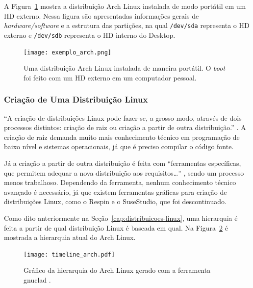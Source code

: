 \documentclass[
article,			%
12pt,				%
openright,			%
oneside,			%
a4paper,			%
chapter=TITLE,		%
section=TITLE,		%
subsection=TITLE,	%
subsubsection=TITLE,%
subsubsubsection=TITLE, %
english,			%
brazil,				%
]{abntex2}
\def\code#1{\texttt{#1}}
\begin{document}
A Figura~\ref{fig:exemplo-distro} mostra a distribuição Arch Linux
instalada de modo portátil em um HD externo. Nessa figura são
apresentadas informações gerais de \emph{hardware/software} e a
estrutura das partições, na qual \code{/dev/sda} representa o HD
externo e \code{/dev/sdb} representa o HD interno do Desktop.

\begin{figure}[!htbp]
    \caption{\label{fig:exemplo-distro}Uma distribuição Arch Linux
        instalada de maneira portátil. O \emph{boot} foi feito com um HD
    externo em um computador pessoal.}
    \begin{center}
        \texttt{[image: exemplo\_arch.png]}
    \end{center}
\end{figure}

\subsubsection{Criação de Uma Distribuição Linux}

``A criação  de  distribuições  Linux pode fazer-se, a grosso modo,
através  de  dois processos distintos: criação de raiz ou criação a
partir de outra distribuição.'' \cite[p.  78]{Nunes2009}. A criação de
raiz demanda muito mais conhecimento técnico em programação de baixo
nível e sistemas operacionais, já que é preciso compilar o código
fonte.

Já a criação a partir de outra distribuição é feita com ``ferramentas
específicas, que  permitem adequar  a  nova  distribuição  aos
requisitos\ldots'' \cite[p. 78]{Nunes2009}, sendo um processo menos
trabalhoso. Dependendo da ferramenta, nenhum conhecimento técnico
avançado é necessário, já que existem ferramentas gráficas para
criação de distribuições Linux, como o Respin \cite{Respin2018} e o
SuseStudio, que foi descontinuado.

Como dito anteriormente na Seção~\ref{cap:distribuicoes-linux}, uma
hierarquia é feita a partir de qual distribuição Linux é baseada em
qual. Na Figura~\ref{fig:hierarquia-arch} é mostrada a hierarquia
atual do Arch Linux.

\begin{figure}[!htbp]
    \caption{\label{fig:hierarquia-arch}Gráfico da hierarquia do Arch
    Linux gerado com a ferramenta gnuclad \cite{Loli2017}.}
    \begin{center}
        \texttt{[image: timeline\_arch.pdf]}
    \end{center}
\end{figure}
\end{document}

